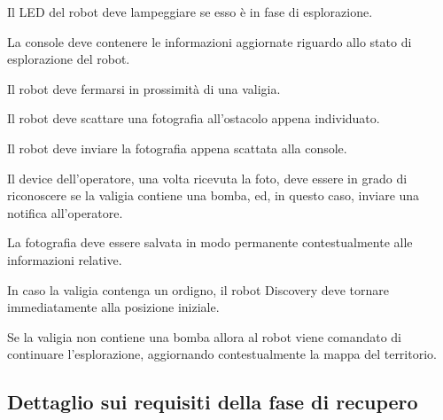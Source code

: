 \begin{description}
  Il LED del robot deve lampeggiare se esso è in fase di esplorazione.

  \item[\requirementref{R-consoleUpdate}]

  La console deve contenere le informazioni aggiornate riguardo allo stato di esplorazione del robot.

  \item[\requirementref{R-stopAtBag}]

  Il robot deve fermarsi in prossimità di una valigia.

  \item[\requirementref{R-takePhoto}]

  Il robot deve scattare una fotografia all'ostacolo appena individuato.

  \item[\requirementref{R-sendPhoto}]

  Il robot deve inviare la fotografia appena scattata alla console.

  \item[\requirementref{R-alert}]

  Il device dell'operatore, una volta ricevuta la foto, deve essere in grado di riconoscere
  se la valigia contiene una bomba, ed, in questo caso, inviare una notifica all'operatore.

  \item[\requirementref{R-storePhoto}]

  La fotografia deve essere salvata in modo permanente contestualmente alle informazioni relative.

  \item[\requirementref{R-backHomeSinceBomb}]

  In caso la valigia contenga un ordigno, il robot Discovery deve tornare immediatamente alla posizione iniziale.

  \item[\requirementref{R-continueExploreAfterPhoto}]

  Se la valigia non contiene una bomba allora al robot viene comandato di continuare l'esplorazione, aggiornando contestualmente la mappa del territorio.
\end{description}

\subsection{Dettaglio sui requisiti della fase di recupero}

